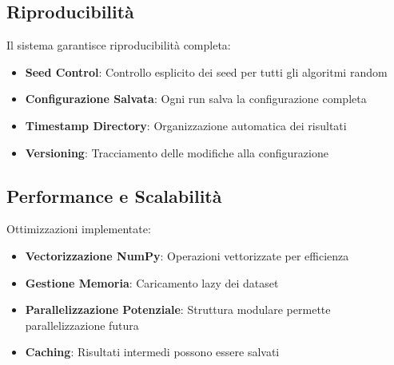 \subsection{Riproducibilità}

Il sistema garantisce riproducibilità completa:

\begin{itemize}
    \item \textbf{Seed Control}: Controllo esplicito dei seed per tutti gli algoritmi random
    \item \textbf{Configurazione Salvata}: Ogni run salva la configurazione completa
    \item \textbf{Timestamp Directory}: Organizzazione automatica dei risultati
    \item \textbf{Versioning}: Tracciamento delle modifiche alla configurazione
\end{itemize}

\subsection{Performance e Scalabilità}

Ottimizzazioni implementate:

\begin{itemize}
    \item \textbf{Vectorizzazione NumPy}: Operazioni vettorizzate per efficienza
    \item \textbf{Gestione Memoria}: Caricamento lazy dei dataset
    \item \textbf{Parallelizzazione Potenziale}: Struttura modulare permette parallelizzazione futura
    \item \textbf{Caching}: Risultati intermedi possono essere salvati
\end{itemize}
